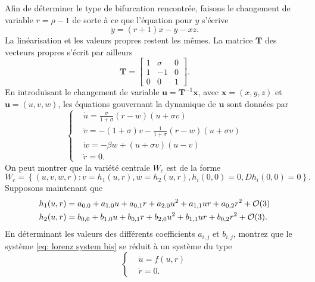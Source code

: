 \documentclass[12pt, answers]{exam}
\begin{document}
\begin{questions}
\begin{parts}
\begin{subparts}
      \subpart[3] Afin de déterminer le type de bifurcation rencontrée, faisons le changement de variable $r = \rho - 1$ de sorte à ce que l'équation pour $y$ s'écrive
      $$
      \dot{y} = (r + 1)x - y - xz.
      $$
      La linéarisation et les valeurs propres restent les mêmes. La matrice $\bm{T}$ des vecteurs propres s'écrit par ailleurs
      $$
      \bm{T}  = \begin{bmatrix}
                    1 & \sigma & 0 \\
                    1 & -1 & 0 \\
                    0 & 0 & 1
                \end{bmatrix}.
      $$
      En introduisant le changement de variable $\bm{u} = \bm{T}^{-1} \bm{x}$, avec $\bm{x} = (x, y, z)$ et $\bm{u} = (u, v, w)$, les équations gouvernant la dynamique de $\bm{u}$ sont données par
      \begin{equation}
        \left\{
        \begin{aligned}
          & \dot{u} = \displaystyle \frac{\sigma}{1+\sigma} \left( r - w \right) \left( u + \sigma v \right) \\
          & \dot{v} = -\left( 1 + \sigma \right)v - \displaystyle \frac{1}{1+\sigma}\left( r - w \right) \left(u + \sigma v \right) \\
          & \dot{w} = -\beta w + \left( u + \sigma v \right) \left( u - v \right) \\
          & \dot{r} = 0.
        \end{aligned}
        \right.
        \label{eq: lorenz system bis}
      \end{equation}
      On peut montrer que la variété centrale $W_c$ est de la forme
      $$
      W_c = \left\{ \left(u, v, w, r \right) : v=h_1(u, r), w = h_2(u, r), h_i(0, 0) = 0, Dh_i(0, 0) = 0 \right\}.
      $$
      Supposons maintenant que
      \begin{equation}
        \begin{aligned}
          h_1(u, r) & = a_{0, 0} + a_{1, 0}u + a_{0, 1}r + a_{2, 0}u^2 + a_{1, 1}ur + a_{0, 2}r^2 + \mathcal{O}(3) \\
          h_2(u, r) & = b_{0, 0} + b_{1, 0}u + b_{0, 1}r + b_{2, 0}u^2 + b_{1, 1}ur + b_{0, 2}r^2 + \mathcal{O}(3).
        \end{aligned}
        \notag
      \end{equation}
      En déterminant les valeurs des différents coefficients $a_{i, j}$ et $b_{i, j}$, montrez que le système \eqref{eq: lorenz system bis} se réduit à un système du type
      \begin{equation}
        \left\{
        \begin{aligned}
          & \dot{u} = f(u, r) \\
          & \dot{r} = 0.
        \end{aligned}
        \right.
        \label{eq: normal form}
      \end{equation}


\end{subparts}
\end{parts}
\end{questions}
\end{document}
